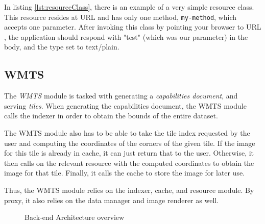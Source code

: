 \documentclass[11pt,a4paper,titlepage,oneside]{report}
\begin{document}
In listing \ref{lst:resourceClass}, there is an example of a very simple resource class. This resource resides at \gls{URL}  and has only one method, \texttt{my-method}, which accepts one parameter. After invoking this class by pointing your browser to \gls{URL} , the application should respond with "test" (which was our parameter) in the body, and the type set to text/plain.

\subsection{WMTS}

The \textit{\gls{WMTS}} module is tasked with generating a \textit{capabilities document}, and serving \textit{tiles}. When generating the capabilities document, the \gls{WMTS} module calls the indexer in order to obtain the bounds of the entire dataset.

The \gls{WMTS} module also has to be able to take the tile index requested by the user and computing the coordinates of the corners of the given tile. If the image for this tile is already in cache, it can just return that to the user.
Otherwise, it then calls on the relevant resource with the computed coordinates to obtain the image for that tile. Finally, it calls the cache to store the image for later use.

Thus, the \gls{WMTS} module relies on the indexer, cache, and resource module. By proxy, it also relies on the data manager and image renderer as well.

\begin{figure}[!htb]
\begin{center}
\caption{Back-end Architecture overview}
\label{fig:Back-endArchitecture}
\end{center}
\end{figure}
\end{document}
